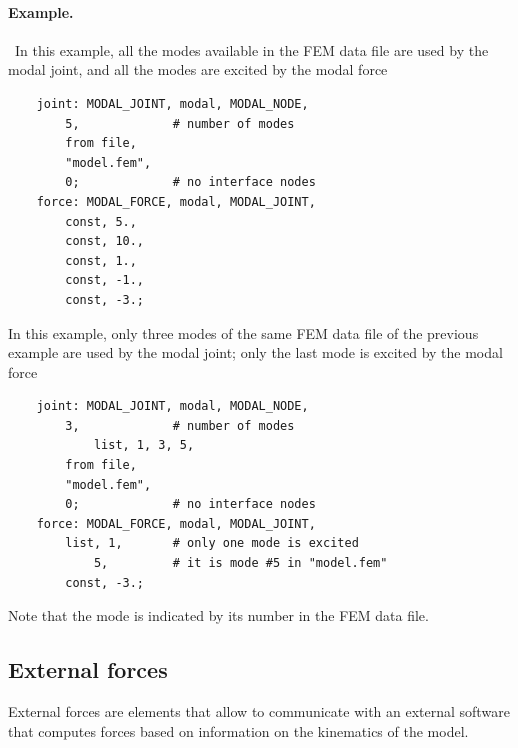 \paragraph{Example.} \
In this example, all the modes available in the FEM data file 
are used by the modal joint, and all the modes are excited
by the modal force
\begin{verbatim}
    joint: MODAL_JOINT, modal, MODAL_NODE,
        5,             # number of modes
        from file,
        "model.fem",
        0;             # no interface nodes
    force: MODAL_FORCE, modal, MODAL_JOINT,
        const, 5.,
        const, 10.,
        const, 1.,
        const, -1.,
        const, -3.;
\end{verbatim}

In this example, only three modes of the same FEM data file
of the previous example are used by the modal joint;
only the last mode is excited by the modal force
\begin{verbatim}
    joint: MODAL_JOINT, modal, MODAL_NODE,
        3,             # number of modes
            list, 1, 3, 5,
        from file,
        "model.fem",
        0;             # no interface nodes
    force: MODAL_FORCE, modal, MODAL_JOINT,
        list, 1,       # only one mode is excited
            5,         # it is mode #5 in "model.fem"
        const, -3.;
\end{verbatim}
Note that the mode is indicated by its number in the FEM data file.




\subsection{External forces}
External forces are elements that allow to communicate
with an external software that computes forces
based on information on the kinematics of the model.

